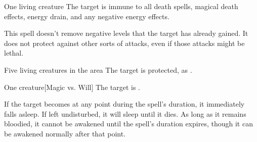 \begin{spellheader}
    \spellrng{\rngclose}
    \spelldur{\durshort}
\end{spellheader}
\begin{spelleffects}
    \begin{spelltarget}{One living creature}
        \spelleffect The target is immune to all death spells, magical death effects, energy drain, and any negative energy effects.
    \end{spelltarget}
\end{spelleffects}
\begin{spellfooter}
    \spellnotes This spell doesn't remove negative levels that the target has already gained. It does not protect against other sorts of attacks, even if those attacks might be lethal.
\end{spellfooter}

\begin{spellheader}
    \spelldur{\durshort}
\end{spellheader}
\begin{spelleffects}
    \begin{spelltarget}{Five living creatures in the area}
        \spelleffect The target is protected, as .
    \end{spelltarget}
\end{spelleffects}

\begin{spellheader}
    \spellrng{\rngmed}
    \spelldur{\durlong}
\end{spellheader}
\begin{spelleffects}
    \begin{spelltarget}{One creature}[Magic vs. Will]
        \spellsuccess The target is \bewildered.

        If the target becomes \bloodied at any point during the spell's duration, it immediately falls asleep. If left undisturbed, it will sleep until it dies. As long as it remains bloodied, it cannot be awakened until the spell's duration expires, though it can be awakened normally after that point.
    \end{spelltarget}
\end{spelleffects}

